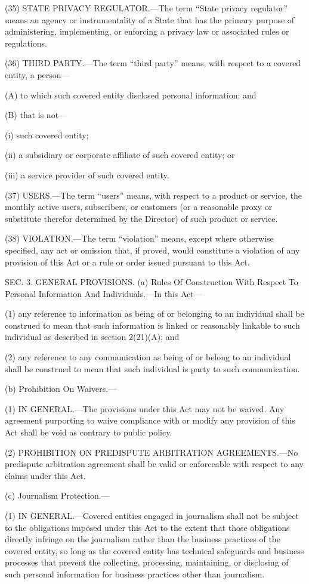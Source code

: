 (35) STATE PRIVACY REGULATOR.—The term “State privacy regulator” means an agency or instrumentality of a State that has the primary purpose of administering, implementing, or enforcing a privacy law or associated rules or regulations.

(36) THIRD PARTY.—The term “third party” means, with respect to a covered entity, a person—

(A) to which such covered entity disclosed personal information; and

(B) that is not—

(i) such covered entity;

(ii) a subsidiary or corporate affiliate of such covered entity; or

(iii) a service provider of such covered entity.

(37) USERS.—The term “users” means, with respect to a product or service, the monthly active users, subscribers, or customers (or a reasonable proxy or substitute therefor determined by the Director) of such product or service.

(38) VIOLATION.—The term “violation” means, except where otherwise specified, any act or omission that, if proved, would constitute a violation of any provision of this Act or a rule or order issued pursuant to this Act.


SEC. 3. GENERAL PROVISIONS.
(a) Rules Of Construction With Respect To Personal Information And Individuals.—In this Act—

(1) any reference to information as being of or belonging to an individual shall be construed to mean that such information is linked or reasonably linkable to such individual as described in section 2(21)(A); and

(2) any reference to any communication as being of or belong to an individual shall be construed to mean that such individual is party to such communication.

(b) Prohibition On Waivers.—

(1) IN GENERAL.—The provisions under this Act may not be waived. Any agreement purporting to waive compliance with or modify any provision of this Act shall be void as contrary to public policy.

(2) PROHIBITION ON PREDISPUTE ARBITRATION AGREEMENTS.—No predispute arbitration agreement shall be valid or enforceable with respect to any claims under this Act.

(c) Journalism Protection.—

(1) IN GENERAL.—Covered entities engaged in journalism shall not be subject to the obligations imposed under this Act to the extent that those obligations directly infringe on the journalism rather than the business practices of the covered entity, so long as the covered entity has technical safeguards and business processes that prevent the collecting, processing, maintaining, or disclosing of such personal information for business practices other than journalism.

